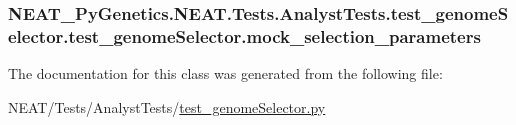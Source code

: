 \subsubsection[{\texorpdfstring{mock\+\_\+selection\+\_\+parameters}{mock_selection_parameters}}]{\setlength{\rightskip}{0pt plus 5cm}N\+E\+A\+T\+\_\+\+Py\+Genetics.\+N\+E\+A\+T.\+Tests.\+Analyst\+Tests.\+test\+\_\+genome\+Selector.\+test\+\_\+genome\+Selector.\+mock\+\_\+selection\+\_\+parameters}\hypertarget{classNEAT__PyGenetics_1_1NEAT_1_1Tests_1_1AnalystTests_1_1test__genomeSelector_1_1test__genomeSelector_ac77001932f6d9ab981a690257f7ff5d1}{}\label{classNEAT__PyGenetics_1_1NEAT_1_1Tests_1_1AnalystTests_1_1test__genomeSelector_1_1test__genomeSelector_ac77001932f6d9ab981a690257f7ff5d1}


The documentation for this class was generated from the following file\+:\begin{DoxyCompactItemize}
\item 
N\+E\+A\+T/\+Tests/\+Analyst\+Tests/\hyperlink{test__genomeSelector_8py}{test\+\_\+genome\+Selector.\+py}\end{DoxyCompactItemize}

